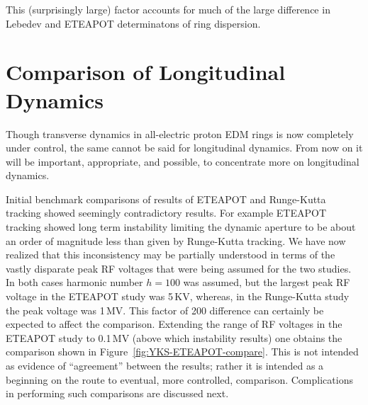 \documentclass[12]{article}
\begin{document}
This (surprisingly large) factor accounts for much of the large difference
in Lebedev and ETEAPOT determinatons of ring dispersion.

\section{Comparison of Longitudinal Dynamics}
Though transverse dynamics in all-electric proton EDM rings is now 
completely under control, the same cannot be said for longitudinal
dynamics.  From now on it will be important, appropriate, and possible, 
to concentrate more on longitudinal dynamics.  

Initial benchmark comparisons of results of ETEAPOT and Runge-Kutta tracking showed 
seemingly contradictory results. For example ETEAPOT tracking\cite{Benchmark-III} 
showed long term instability limiting the dynamic aperture
to be about an order of magnitude less than given by Runge-Kutta 
tracking\cite{YKS-tracking}. We have now
realized that this inconsistency may be partially understood in terms of
the vastly disparate peak RF voltages that were being assumed for the
two studies. In both cases harmonic number $h=100$ was assumed, but 
the largest peak RF voltage in the ETEAPOT study was 5\,KV, whereas, 
in the Runge-Kutta study the peak voltage was 1\,MV. 
This factor of 200 difference can certainly be expected to affect the
comparison. Extending the range of RF voltages in the ETEAPOT study 
to 0.1\,MV (above which instability results) one obtains the comparison 
shown in Figure~\ref{fig:YKS-ETEAPOT-compare}. This is not intended
as evidence of ``agreement'' between the results; rather it is intended 
as a beginning on the route to eventual, more controlled, comparison. 
Complications in performing such comparisons are discussed next.
\end{document}
